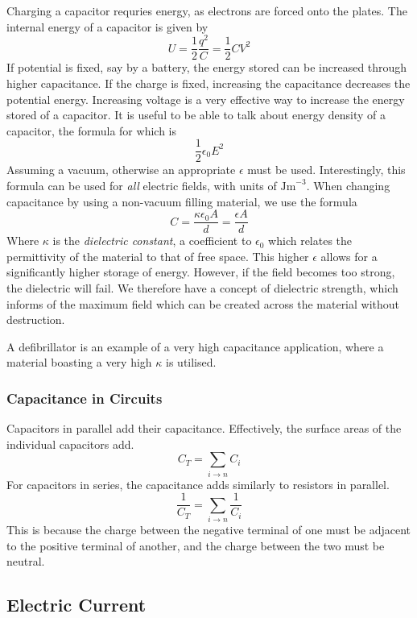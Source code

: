 \documentclass[12pt]{report}
\begin{document}
\begin{flushleft}
Charging a capacitor requries energy, as electrons are forced onto the plates.
The internal energy of a capacitor is given by
\[U = \frac{1}{2}\frac{q^2}{C} = \frac{1}{2}CV^2\]
If potential is fixed, say by a battery, the energy stored can be increased
through higher capacitance. If the charge is fixed, increasing the capacitance
decreases the potential energy. Increasing voltage is a very effective way to
increase the energy stored of a capacitor. It is useful to be able to talk 
about energy density of a capacitor, the formula for which is
\[\frac{1}{2}\epsilon_0E^2\]
Assuming a vacuum, otherwise an appropriate \(\epsilon\) must be used. 
Interestingly, this formula can be used for \textit{all} electric fields, with
units of \(\mathrm{Jm}^{-3}\). When changing capacitance by using a non-vacuum
filling material, we use the formula
\[C = \frac{\kappa\epsilon_0A}{d} = \frac{\epsilon A}{d}\]
Where \(\kappa\) is the \textit{dielectric constant}, a coefficient to 
\(\epsilon_0\) which relates the permittivity of the material to that of free 
space. This higher \(\epsilon\) allows for a significantly higher storage of
energy. However, if the field becomes too strong, the dielectric will fail.
We therefore have a concept of dielectric strength, which informs of the 
maximum field which can be created across the material without destruction. 
\par
A defibrillator is an example of a very high capacitance application, where a
material boasting a very high \(\kappa\) is utilised.

\subsubsection*{Capacitance in Circuits}

Capacitors in parallel add their capacitance. Effectively, the surface areas of
the individual capacitors add.
\[C_T = \sum_{i\rightarrow n} C_i\]
For capacitors in series, the capacitance adds similarly to resistors in 
parallel. 
\[\frac{1}{C_T} = \sum_{i\rightarrow n} \frac{1}{C_i}\]
This is because the charge between the negative terminal of one must be 
adjacent to the positive terminal of another, and the charge between the two
must be neutral.

\subsection*{Electric Current}


\end{flushleft}
\end{document}
